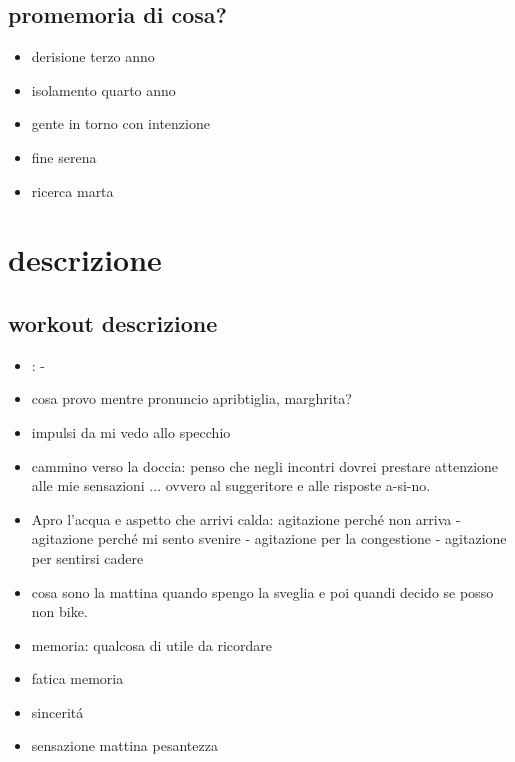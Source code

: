 \subsection{promemoria di cosa?}

\begin{itemize}

\item derisione terzo anno

\item isolamento quarto anno

\item gente in  torno con intenzione

\item fine serena

\item ricerca marta

\end{itemize}


\section{descrizione}

\subsection{workout descrizione}\label{ssec:wdesc}

\begin{itemize}

\item {}:  - 

\item cosa provo mentre pronuncio apribtiglia, marghrita?

\item impulsi da mi vedo allo specchio

\item cammino verso la doccia: penso che negli incontri dovrei prestare attenzione alle mie sensazioni ... ovvero al suggeritore e alle risposte a-si-no. 

\item Apro l'acqua e aspetto che arrivi calda: agitazione perch\'e non arriva - agitazione perch\'e mi sento svenire - agitazione per la congestione - agitazione per sentirsi cadere

\item cosa sono la mattina quando spengo la sveglia e poi quandi decido se posso non bike.

\item memoria: qualcosa di utile da ricordare

\item fatica memoria

\item sincerit\'a

\item sensazione mattina pesantezza

\end{itemize}

